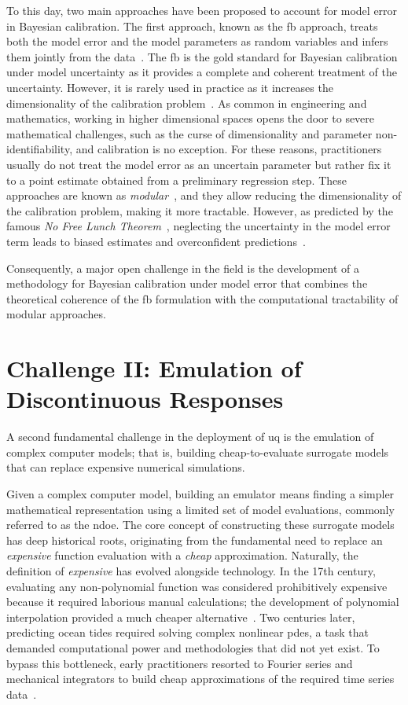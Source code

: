 \smallskip
To this day, two main approaches have been proposed to account for model error in Bayesian calibration. The first approach, known as the \gls{fb} approach, treats both the model error and the model parameters as random variables and infers them jointly from the data~\cite{koh2001}. The \gls{fb} is the gold standard for Bayesian calibration under model uncertainty as it provides a complete and coherent treatment of the uncertainty. However, it is rarely used in practice as it increases the dimensionality of the calibration problem~\cite{fmp}. As common in engineering and mathematics, working in higher dimensional spaces opens the door to severe mathematical challenges, such as the curse of dimensionality and parameter non-identifiability, and calibration is no exception. For these reasons, practitioners usually do not treat the model error as an uncertain parameter but rather fix it to a point estimate obtained from a preliminary regression step. These approaches are known as \textit{modular}~\cite{mod_approaches}, and they allow reducing the dimensionality of the calibration problem, making it more tractable. However, as predicted by the famous \textit{No Free Lunch Theorem}~\cite{nflt}, neglecting the uncertainty in the model error term leads to biased estimates and overconfident predictions~\cite{fmp}. 

\smallskip
Consequently, a major open challenge in the field is the development of a methodology for Bayesian calibration under model error that combines the theoretical coherence of the \gls{fb} formulation with the computational tractability of modular approaches.


\section{Challenge II: Emulation of Discontinuous Responses}
\label{sec:intro:ch2}

A second fundamental challenge in the deployment of \gls{uq} is the emulation of complex computer models; that is, building cheap-to-evaluate surrogate models that can replace expensive numerical simulations.

\smallskip
Given a complex computer model, building an emulator means finding a simpler mathematical representation using a limited set of model evaluations, commonly referred to as the \gls{ndoe}. The core concept of constructing these surrogate models has deep historical roots, originating from the fundamental need to replace an \textit{expensive} function evaluation with a \textit{cheap} approximation. Naturally, the definition of \textit{expensive} has evolved alongside technology. In the 17th century, evaluating any non-polynomial function was considered prohibitively expensive because it required laborious manual calculations; the development of polynomial interpolation provided a much cheaper alternative~\cite{laplace_poly}. Two centuries later, predicting ocean tides required solving complex nonlinear \glspl{pde}, a task that demanded computational power and methodologies that did not yet exist. To bypass this bottleneck, early practitioners resorted to Fourier series and mechanical integrators to build cheap approximations of the required time series data~\cite{Tides}.


